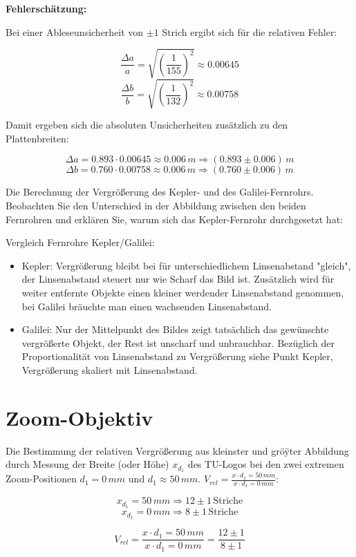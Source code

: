 \documentclass[
  headings=optiontotocandhead,
  twoside,
  openright,
  numbers=noenddot,
  toc=flat,
  11pt,
  parskip=full,
  listof=flat,
  bibliography=totoc,
  a4paper,
  DIV=14,
  BCOR=22mm,
  headheight=5mm,
  headinclude=true,
]{scrartcl}
\begin{document}
\textbf{Fehlerschätzung:}

Bei einer Ableseunsicherheit von $\pm 1$ Strich ergibt sich für die relativen Fehler:

\[
\frac{\Delta a}{a} =
\sqrt{\left(\frac{1}{155}\right)^2}
\approx 0.00645
\]
\[
\frac{\Delta b}{b} =
\sqrt{\left(\frac{1}{132}\right)^2}
\approx 0.00758
\]

Damit ergeben sich die absoluten Unsicherheiten zusätzlich zu den Plattenbreiten:

\[
\Delta a = 0.893 \cdot 0.00645
\approx 0.006\,m
\Rightarrow (0.893 \pm 0.006)\,m
\]
\[
\Delta b = 0.760 \cdot 0.00758
\approx 0.006\,m
\Rightarrow (0.760 \pm 0.006)\,m
\]


Die Berechnung der Vergrößerung des Kepler- und des Galilei-Fernrohrs. Beobachten Sie den Unterschied in der Abbildung zwischen den beiden Fernrohren und erklären Sie, warum sich das Kepler-Fernrohr durchgesetzt hat:

Vergleich Fernrohre Kepler/Galilei:
\begin{itemize}
  \item Kepler: Vergrößerung bleibt bei für unterschiedlichem Linsenabstand "gleich", der Linsenabstand steuert nur wie Scharf das Bild ist. Zusätzlich wird für weiter entfernte Objekte einen kleiner werdender Linsenabstand genommen, bei Galilei bräuchte man einen wachsenden Linsenabstand.
  \item Galilei: Nur der Mittelpunkt des Bildes zeigt tatsächlich das gewünschte vergrößerte Objekt, der Rest ist unscharf und unbrauchbar. Bezüglich der Proportionalität von Linsenabstand zu Vergrößerung siehe Punkt Kepler, Vergrößerung skaliert mit Linsenabstand. 
\end{itemize}

\section{Zoom-Objektiv}

Die Bestimmung der relativen Vergrößerung aus kleinster und gröÿter Abbildung durch Messung der Breite (oder Höhe) $x_{d_1}$ des TU-Logos bei den zwei extremen Zoom-Positionen $d_1 = 0 \, mm$ und $d_1 \approx 50 \, mm$. $V_{rel} = \frac{x \cdot d_1 = 50 \, mm}{x \cdot d_1 = 0 \, mm}$:

$$ x_{d_1} = 50 \, mm \Rightarrow 12 \pm 1 \, \text{Striche} $$
$$ x_{d_1} = 0 \, mm \Rightarrow 8 \pm 1 \, \text{Striche} $$

$$ V_{rel} = \frac{x \cdot d_1 = 50 \, mm}{x \cdot d_1 = 0 \, mm} = \frac{12 \pm 1}{8 \pm 1} $$
\end{document}

